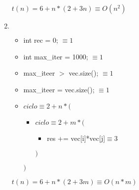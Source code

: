 \documentclass{article}
\begin{document}
\begin{enumerate}
\begin{itemize}
        \end{itemize}
        $t(n)= 6 + n*(2+3n) \equiv O(n^{2})$
    \item $ $
        
        \begin{itemize}
            \item int rec = 0; $\equiv 1$
            \item int max\_iter = 1000; $\equiv 1$
            \item max\_iteer $>$ vec.size(); $\equiv 1$
            \item max\_iteer = vec.size(); $\equiv 1$
            \item $ciclo \equiv 2 + n *($
                \begin{itemize}
                    \item $ciclo \equiv 2 + m *($
                        \begin{itemize}
                            \item res += vec[i]*vec[j]$\equiv 3$
                        \end{itemize}
                    $)$
                \end{itemize}
            $)$
        \end{itemize}
        $t(n)= 6 + n*(2+3m) \equiv O(n*m)$
\end{enumerate}
\end{document}
